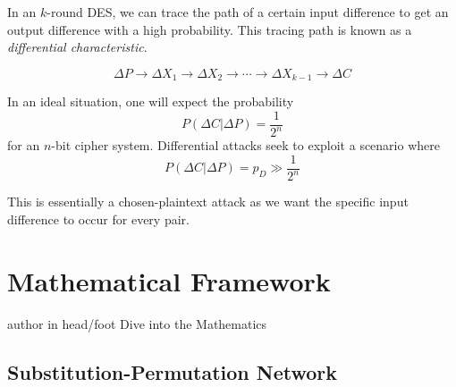 \documentclass[9pt]{beamer}
\begin{document}
\begin{frame}
In an $k$-round DES, we can trace the path of a certain input difference to get an output difference with a high probability. This tracing path is known as a {\it differential characteristic}.

\[ \Delta P \rightarrow \Delta X_1 \rightarrow \Delta X_2 \rightarrow \cdots \rightarrow \Delta X_{k-1} \rightarrow \Delta C \]

In an ideal situation, one will expect the probability
\[ P \left(\Delta C | \Delta P \right) = \frac{1}{2^n} \]
for an $n$-bit cipher system. Differential attacks seek to exploit a scenario where
\[ P \left(\Delta C | \Delta P \right) = p_D \gg \frac{1}{2^n} \]

This is essentially a chosen-plaintext attack as we want the specific input difference to occur for every pair.
\end{frame}

\section{Mathematical Framework}
\begin{frame}
\begin{beamercolorbox}[ht=2.5ex,dp=1.125ex,center,rounded=true,shadow=true]{author in head/foot}
Dive into the Mathematics
\end{beamercolorbox}
\end{frame}

\subsection{Substitution-Permutation Network}
\end{document}
